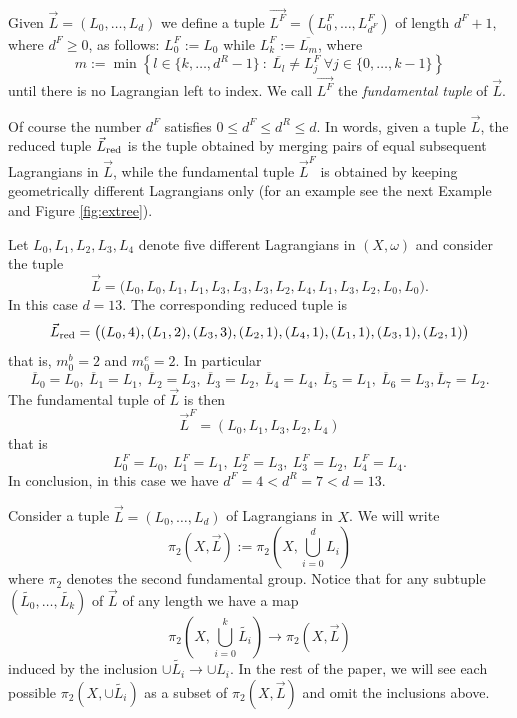 \begin{dfn}\label{deffundamentaltuple}
	Given $\vec{L}=(L_0,\ldots,L_d)$ we define a tuple $\vec{L^F}=(L_0^F,\ldots, L_{d^F}^F)$ of length $d^F+1$, where $d^F\geq 0$, as follows: $L_0^F:= L_0$ while $L_k^F:=\overline{L_m}$, where $$m:=\min\left\{l\in \{k,\ldots, d^R-1\} \ : \ \overline{L_l}\neq L_j^F \ \forall j\in \{0,\ldots, k-1\}\right\}$$ until there is no Lagrangian left to index. We call $\vec{L^F}$ the \textit{fundamental tuple} of $\vec{L}$.
\end{dfn}

\noindent Of course the number $d^F$ satisfies $0\leq d^F\leq d^R\leq d$. In words, given a tuple $\vec{L}$, the reduced tuple $\vec{L}_\textnormal{red}$ is the tuple obtained by merging pairs of equal subsequent Lagrangians in $\vec{L}$, while the fundamental tuple $\vec{L}^F$ is obtained by keeping geometrically different Lagrangians only (for an example see the next Example and Figure \ref{fig:extree}).
\begin{example}
	Let $L_0,L_1,L_2,L_3,L_4$ denote five different Lagrangians in $(X,\omega)$ and consider the tuple $$\vec{L}=\bigl(L_0,L_0,L_1,L_1,L_3,L_3,L_3,L_2,L_4,L_1,L_3,L_2,L_0,L_0\bigr).$$ In this case $d=13$. The corresponding reduced tuple is $$\vec{L}_\textnormal{red} = \bigl((L_0,4), (L_1,2),(L_3,3),(L_2,1),(L_4,1),(L_1,1),(L_3,1),(L_2,1)\bigr)$$ that is, $m_0^b=2$ and $m_0^e=2$. In particular $$\overline{L}_0 = L_0, \ \overline{L}_1=L_1, \ \overline{L}_2= L_3, \ \overline{L}_3=L_2, \ \overline{L}_4=L_4, \ \overline{L}_5=L_1, \ \overline{L}_6=L_3, \overline{L}_7=L_2. $$ The fundamental tuple of $\vec{L}$ is then $$\vec{L}^F= (L_0,L_1,L_3,L_2,L_4)$$ that is $$L_0^F= L_0, \ L_1^F=L_1, \ L_2^F=L_3, \ L_3^F=L_2, \ L_4^F=L_4.$$
	In conclusion, in this case we have $d^F=4< d^R=7<d=13$.
\end{example}

Consider a tuple $\vec{L}=(L_0,\ldots,L_d)$ of Lagrangians in $X$. We will write $$\pi_2(X,\vec{L}):=\pi_2\left(X,\bigcup_{i=0}^dL_i\right)$$ where $\pi_2$ denotes the second fundamental group. Notice that for any subtuple $(\tilde{L_0},\ldots, \tilde{L_k})$ of $\vec{L}$ of any length we have a map $$\pi_2\left(X,\bigcup_{i=0}^k\tilde{L_i}\right)\to \pi_2(X,\vec{L})$$ induced by the inclusion $\cup \tilde{L_i}\to \cup L_i$. In the rest of the paper, we will see each possible $\pi_2(X,\cup \tilde{L_i})$ as a subset of $\pi_2(X,\vec{L})$ and omit the inclusions above.\label{piconvention}




